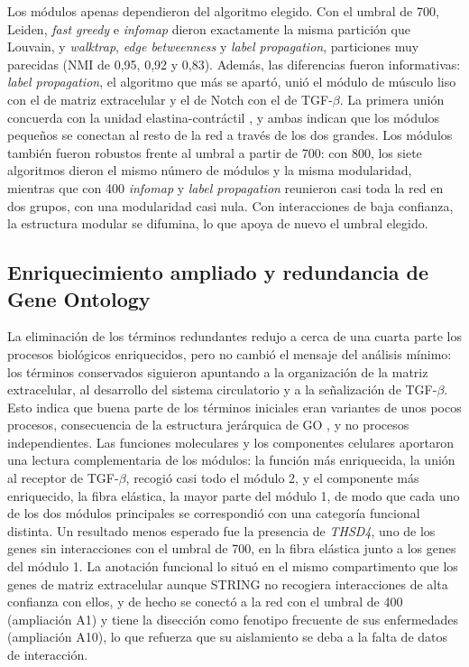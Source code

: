 Los módulos apenas dependieron del algoritmo elegido. Con el umbral de 700, Leiden, \textit{fast greedy} e \textit{infomap} dieron exactamente la misma partición que Louvain, y \textit{walktrap}, \textit{edge betweenness} y \textit{label propagation}, particiones muy parecidas (NMI de 0,95, 0,92 y 0,83). Además, las diferencias fueron informativas: \textit{label propagation}, el algoritmo que más se apartó, unió el módulo de músculo liso con el de matriz extracelular y el de Notch con el de TGF-$\beta$. La primera unión concuerda con la unidad elastina-contráctil \cite{Karimi2016}, y ambas indican que los módulos pequeños se conectan al resto de la red a través de los dos grandes. Los módulos también fueron robustos frente al umbral a partir de 700: con 800, los siete algoritmos dieron el mismo número de módulos y la misma modularidad, mientras que con 400 \textit{infomap} y \textit{label propagation} reunieron casi toda la red en dos grupos, con una modularidad casi nula. Con interacciones de baja confianza, la estructura modular se difumina, lo que apoya de nuevo el umbral elegido.

\subsection{Enriquecimiento ampliado y redundancia de Gene Ontology}

La eliminación de los términos redundantes redujo a cerca de una cuarta parte los procesos biológicos enriquecidos, pero no cambió el mensaje del análisis mínimo: los términos conservados siguieron apuntando a la organización de la matriz extracelular, al desarrollo del sistema circulatorio y a la señalización de TGF-$\beta$. Esto indica que buena parte de los términos iniciales eran variantes de unos pocos procesos, consecuencia de la estructura jerárquica de GO \cite{Ashburner2000}, y no procesos independientes. Las funciones moleculares y los componentes celulares aportaron una lectura complementaria de los módulos: la función más enriquecida, la unión al receptor de TGF-$\beta$, recogió casi todo el módulo 2, y el componente más enriquecido, la fibra elástica, la mayor parte del módulo 1, de modo que cada uno de los dos módulos principales se correspondió con una categoría funcional distinta. Un resultado menos esperado fue la presencia de \textit{THSD4}, uno de los genes sin interacciones con el umbral de 700, en la fibra elástica junto a los genes del módulo 1. La anotación funcional lo situó en el mismo compartimento que los genes de matriz extracelular aunque STRING no recogiera interacciones de alta confianza con ellos, y de hecho se conectó a la red con el umbral de 400 (ampliación A1) y tiene la disección como fenotipo frecuente de sus enfermedades (ampliación A10), lo que refuerza que su aislamiento se deba a la falta de datos de interacción.

